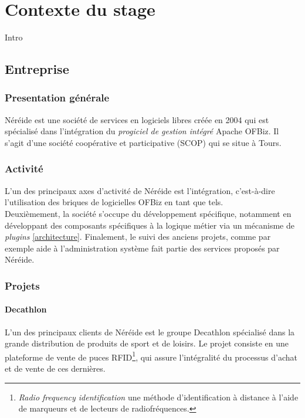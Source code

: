 \chapter{Contexte du stage}

Intro

\section{Entreprise}

\subsection{Presentation générale }
Néréide est une société de services en logiciels libres créée en 2004 qui est spécialisé dans l'intégration du \emph{progiciel de gestion intégré} Apache OFBiz. Il s'agit d'une société coopérative et participative (SCOP) qui se situe à Tours. 



\subsection{Activité}
\label{activite}


L'un des principaux axes d'activité de Néréide est l'intégration, c'est-à-dire l'utilisation des briques de logicielles OFBiz en tant que tels. \\
Deuxièmement, la société s'occupe du développement spécifique, notamment en développant des composants spécifiques à la logique métier via un mécanisme de \emph{plugins} \ref{architecture}. 
Finalement, le suivi des anciens projets, comme par exemple aide à l'administration système fait partie des services proposés par Néréide. 
\subsection{Projets}
\subsubsection{Decathlon}
L'un des principaux clients de Néréide est le groupe Decathlon spécialisé dans la grande distribution de produits de sport et de loisirs. 
Le projet consiste en une plateforme de vente de puces RFID\footnote{\emph{Radio frequency identification} une méthode d'identification à distance à l'aide de marqueurs et de lecteurs de radiofréquences.}, qui assure l'intégralité du processus d'achat et de vente de ces dernières.


